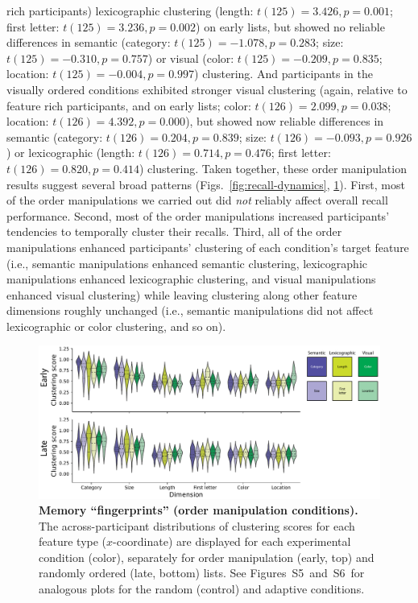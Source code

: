 \documentclass[11pt]{article}
\newcommand{\fingerprintsRandom}{S5}
\newcommand{\fingerprintsAdaptive}{S6}
\begin{document}
rich participants) lexicographic clustering (length: $t(125) = 3.426, p =
0.001$; first letter: $t(125) = 3.236, p = 0.002$) on early lists, but showed
no reliable differences in semantic (category: $t(125) = -1.078, p = 0.283$;
size: $t(125) = -0.310, p = 0.757$) or visual (color: $t(125) = -0.209, p =
0.835$; location: $t(125) = -0.004, p = 0.997$) clustering. And participants in
the visually ordered conditions exhibited stronger visual clustering (again,
relative to feature rich participants, and on early lists; color: $t(126) =
2.099, p = 0.038$; location: $t(126) = 4.392, p = 0.000$), but showed now
reliable differences in semantic (category: $t(126) = 0.204, p = 0.839$; size:
$t(126) = -0.093, p = 0.926$) or lexicographic (length: $t(126) = 0.714, p =
0.476$; first letter: $t(126) = 0.820, p = 0.414$) clustering. Taken together,
these order manipulation results suggest several broad patterns
(Figs.~\ref{fig:recall-dynamics}, \ref{fig:fingerprints}). First, most of the
order manipulations we carried out did \textit{not} reliably affect overall
recall performance. Second, most of the order manipulations increased
participants' tendencies to temporally cluster their recalls. Third, all of the
order manipulations enhanced participants' clustering of each condition's
target feature (i.e., semantic manipulations enhanced semantic clustering,
lexicographic manipulations enhanced lexicographic clustering, and visual
manipulations enhanced visual clustering) while leaving clustering along other
feature dimensions roughly unchanged (i.e., semantic manipulations did not
affect lexicographic or color clustering, and so on).

\begin{figure}[tp] \centering
    \includegraphics[width=\textwidth]{figures/fingerprints}
    
\caption{\textbf{Memory ``fingerprints'' (order manipulation conditions).} The
across-participant distributions of clustering scores for each feature type
($x$-coordinate) are displayed for each experimental condition (color),
separately for order manipulation (early, top) and randomly ordered (late,
bottom) lists. See Figures~\fingerprintsRandom~and~\fingerprintsAdaptive~for
analogous plots for the random (control) and adaptive conditions.}
\label{fig:fingerprints}

\end{figure}
\end{document}
